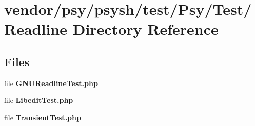 \section{vendor/psy/psysh/test/\+Psy/\+Test/\+Readline Directory Reference}
\label{dir_8252421b992cb2f5a689448267bb5cfe}
\subsection*{Files}
\begin{DoxyCompactItemize}
\item 
file {\bf G\+N\+U\+Readline\+Test.\+php}
\item 
file {\bf Libedit\+Test.\+php}
\item 
file {\bf Transient\+Test.\+php}
\end{DoxyCompactItemize}
